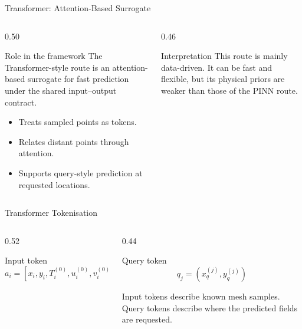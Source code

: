 
\begin{frame}{Transformer: Attention-Based Surrogate}
  \begin{columns}[T]
    \begin{column}{0.50\textwidth}
      \begin{block}{Role in the framework}
        \footnotesize
        The Transformer-style route is an attention-based surrogate for fast
        prediction under the shared input--output contract.
      \end{block}
      \begin{itemize}
        \footnotesize
        \item Treats sampled points as tokens.
        \item Relates distant points through attention.
        \item Supports query-style prediction at requested locations.
      \end{itemize}
    \end{column}
    \begin{column}{0.46\textwidth}
      \begin{alertblock}{Interpretation}
        \footnotesize
        This route is mainly data-driven. It can be fast and flexible, but its
        physical priors are weaker than those of the PINN route.
      \end{alertblock}
    \end{column}
  \end{columns}
\end{frame}

\begin{frame}{Transformer Tokenisation}
  \begin{columns}[T]
    \begin{column}{0.52\textwidth}
      \begin{block}{Input token}
        \[
          a_i=[x_i,y_i,T_i^{(0)},u_i^{(0)},v_i^{(0)},
          \dot u_i^{(0)},\dot v_i^{(0)},E_i,\nu_i,\rho_i,
          \alpha_i,k_i,C_{p,i}]
        \]
      \end{block}
    \end{column}
    \begin{column}{0.44\textwidth}
      \begin{block}{Query token}
        \[
          q_j=(x_q^{(j)},y_q^{(j)})
        \]
      \end{block}
      \footnotesize
      Input tokens describe known mesh samples. Query tokens describe where the
      predicted fields are requested.
    \end{column}
  \end{columns}
\end{frame}

